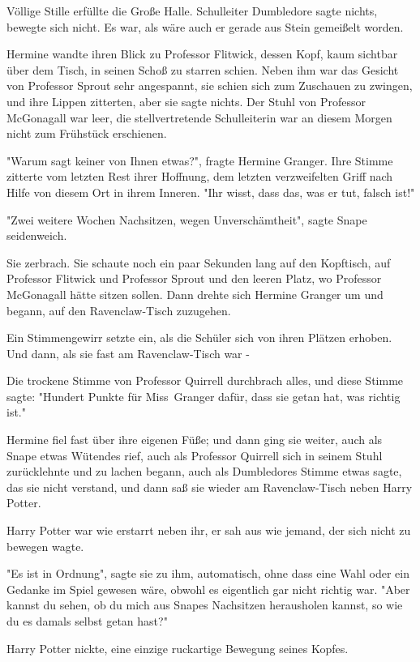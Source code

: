 {Völlige Stille erfüllte die Große Halle. Schulleiter Dumbledore sagte nichts, bewegte sich nicht. Es war, als wäre auch er gerade aus Stein gemeißelt worden.

Hermine wandte ihren Blick zu Professor Flitwick, dessen Kopf, kaum sichtbar über dem Tisch, in seinen Schoß zu starren schien. Neben ihm war das Gesicht von Professor Sprout sehr angespannt, sie schien sich zum Zuschauen zu zwingen, und ihre Lippen zitterten, aber sie sagte nichts. Der Stuhl von Professor McGonagall war leer, die stellvertretende Schulleiterin war an diesem Morgen nicht zum Frühstück erschienen.

"Warum sagt keiner von Ihnen etwas?", fragte Hermine Granger. Ihre Stimme zitterte vom letzten Rest ihrer Hoffnung, dem letzten verzweifelten Griff nach Hilfe von diesem Ort in ihrem Inneren. "Ihr wisst, dass das, was er tut, falsch ist!"

"Zwei weitere Wochen Nachsitzen, wegen Unverschämtheit", sagte Snape seidenweich.

Sie zerbrach. Sie schaute noch ein paar Sekunden lang auf den Kopftisch, auf Professor Flitwick und Professor Sprout und den leeren Platz, wo Professor McGonagall hätte sitzen sollen. Dann drehte sich Hermine Granger um und begann, auf den Ravenclaw-Tisch zuzugehen.

Ein Stimmengewirr setzte ein, als die Schüler sich von ihren Plätzen erhoben. Und dann, als sie fast am Ravenclaw-Tisch war -

Die trockene Stimme von Professor Quirrell durchbrach alles, und diese Stimme sagte: "Hundert Punkte für Miss~Granger dafür, dass sie getan hat, was richtig ist."

Hermine fiel fast über ihre eigenen Füße; und dann ging sie weiter, auch als Snape etwas Wütendes rief, auch als Professor Quirrell sich in seinem Stuhl zurücklehnte und zu lachen begann, auch als Dumbledores Stimme etwas sagte, das sie nicht verstand, und dann saß sie wieder am Ravenclaw-Tisch neben Harry Potter.

Harry Potter war wie erstarrt neben ihr, er sah aus wie jemand, der sich nicht zu bewegen wagte.

"Es ist in Ordnung", sagte sie zu ihm, automatisch, ohne dass eine Wahl oder ein Gedanke im Spiel gewesen wäre, obwohl es eigentlich gar nicht richtig war. "Aber kannst du sehen, ob du mich aus Snapes Nachsitzen herausholen kannst, so wie du es damals selbst getan hast?"

Harry Potter nickte, eine einzige ruckartige Bewegung seines Kopfes.

}
